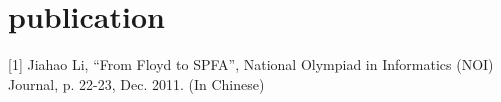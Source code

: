 \documentclass[]{friggeri-cv} %
\begin{document}

\section{publication}

[1] Jiahao Li, ``From Floyd to SPFA'', National Olympiad in Informatics (NOI) Journal, p. 22-23, Dec. 2011. (In Chinese)

\end{document}
